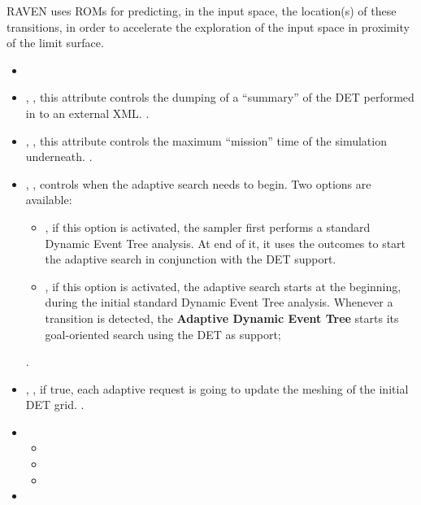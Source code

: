 RAVEN uses ROMs for predicting, in the input space,
the location(s) of these transitions, in order to accelerate the exploration of
the input space in proximity of the limit surface.

%
\attrIntro

\begin{itemize}
  \itemsep0em
  \item \nameDescription
  \item {}, ,
    this attribute controls the dumping of a ``summary'' of the DET performed in
    to an external XML.
    .
  \item {}, , this
    attribute controls the maximum ``mission'' time of the simulation
    underneath.
    .
  \item {}, , controls when the
    adaptive search needs to begin.
    Two options are available:
    \begin{itemize}
       \item {}, if this option is activated, the sampler first
         performs a standard Dynamic Event Tree analysis. At end of it, it uses
         the outcomes to start the adaptive search in conjunction with the DET
         support.
       \item {}, if this option is activated, the adaptive
         search starts at the beginning, during the initial standard Dynamic
         Event Tree analysis.
         Whenever a transition is detected, the
         \textbf{Adaptive Dynamic Event Tree} starts its goal-oriented search
         using the DET as support;
    \end{itemize}
      .
  \item {}, , if true,
    each adaptive request is going to update the meshing of the initial DET
    grid.
    .
\end{itemize}
\begin{itemize}
\item \variableDescription
  \variableChildrenIntro
 \begin{itemize}
    \item \distributionDescription
    \item \functionDescription
    \item \gridDescription
  \end{itemize}
  \item \constantVariablesDescription
\end{itemize}

